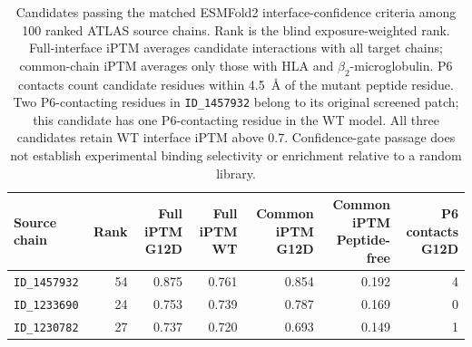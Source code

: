\begin{table}[htbp]
    \centering
    \small
    \begin{tabular}{lrrrrrr}
        \toprule
        Source chain & Rank & \shortstack{Full iPTM\\G12D} & \shortstack{Full iPTM\\WT} & \shortstack{Common iPTM\\G12D} & \shortstack{Common iPTM\\Peptide-free} & \shortstack{P6 contacts\\G12D} \\
        \midrule
        \texttt{ID\_1457932} & 54 & 0.875 & 0.761 & 0.854 & 0.192 & 4 \\
        \texttt{ID\_1233690} & 24 & 0.753 & 0.739 & 0.787 & 0.169 & 0 \\
        \texttt{ID\_1230782} & 27 & 0.737 & 0.720 & 0.693 & 0.149 & 1 \\
        \bottomrule
    \end{tabular}
    \caption[KRAS candidates passing matched interface-confidence criteria]{Candidates passing the matched ESMFold2 interface-confidence criteria among 100 ranked ATLAS source chains. Rank is the blind exposure-weighted rank. Full-interface iPTM averages candidate interactions with all target chains; common-chain iPTM averages only those with HLA and $\beta_2$-microglobulin. P6 contacts count candidate residues within 4.5~\AA{} of the mutant peptide residue. Two P6-contacting residues in \texttt{ID\_1457932} belong to its original screened patch; this candidate has one P6-contacting residue in the WT model. All three candidates retain WT interface iPTM above 0.7. Confidence-gate passage does not establish experimental binding selectivity or enrichment relative to a random library.}
    \label{tab:jaxka-kras-candidates}
\end{table}

